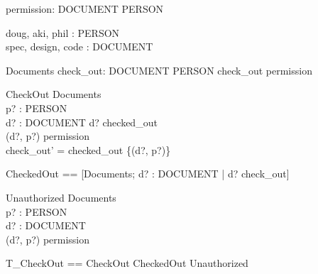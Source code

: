 \documentclass{llncs}
\begin{document}
\begin{zed}
\end{zed}

\begin{axdef}
permission: DOCUMENT \rel PERSON
\end{axdef}

\begin{axdef}
doug, aki, phil : PERSON \\
spec, design, code : DOCUMENT
\end{axdef}

\begin{schema}{Documents}
check\_out: DOCUMENT \pfun PERSON
\where
check\_out \subseteq permission
\end{schema}

\begin{schema}{CheckOut}
\Delta Documents \\
p? : PERSON \\
d? : DOCUMENT
\where
d? \notin \dom checked\_out \\
(d?, p?) \in permission \\
check\_out' = checked\_out \cup \{(d?, p?)\}
\end{schema}

\begin{zed}
CheckedOut == [\Xi Documents; d? : DOCUMENT | d? \in \dom
check\_out]
\end{zed}

\begin{schema}{Unauthorized}
\Xi Documents \\
p? : PERSON \\
d? : DOCUMENT \\
\where (d?, p?) \notin permission
\end{schema}

\begin{zed}
T\_CheckOut == CheckOut \lor CheckedOut \lor Unauthorized
\end{zed}
\end{document}
